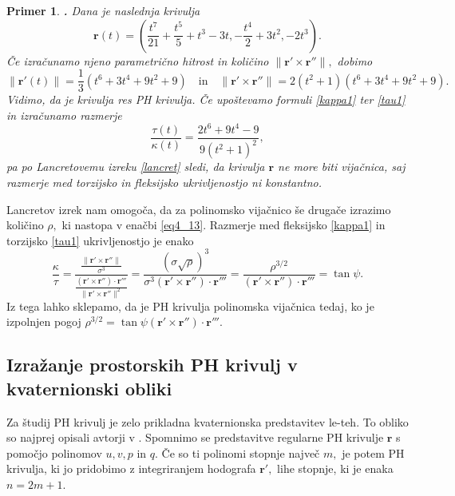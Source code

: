 \documentclass[12pt,a4paper,twoside]{article}
\theoremstyle{definition} %
\theoremstyle{plain} %
\theoremstyle{primerstyle}
\newtheorem{primer}[definicija]{Primer}
\numberwithin{equation}{section}  %
\newcommand{\fleksija}{\frac{\lVert \mathbf{r}'\times\mathbf{r}'' \rVert}{\sigma^3}}
\newcommand{\torzija}{\frac{(\mathbf{r}'\times\mathbf{r}'')\cdot\mathbf{r}'''}{\lVert \mathbf{r}'\times\mathbf{r}'' \rVert^2}}
\newcommand{\rV}{\mathbf{r}}
\begin{document}
\begin{primer}
	\label{PH_ne_vijacnica}
	\textbf{.} Dana je naslednja krivulja
	\begin{equation*}
		\rV(t)=\left ( \frac{t^7}{21}+\frac{t^5}{5}+t^3-3t,-\frac{t^4}{2}+3t^2,-2t^3 \right ).
	\end{equation*}
	Če izračunamo njeno parametrično hitrost in količino $\lVert \rV' \times \rV'' \rVert,$ dobimo
	\begin{equation*}
		\lVert \rV'(t) \rVert=\frac{1}{3}(t^6+3t^4+9t^2+9) \quad \text{in} \quad \lVert \rV' \times \rV'' \rVert=2(t^2+1)(t^6+3t^4+9t^2+9).
	\end{equation*}
	Vidimo, da je krivulja res PH krivulja. Če upoštevamo formuli \eqref{kappa1} ter \eqref{tau1} in izračunamo razmerje
	\begin{equation*}
		\frac{\tau(t)}{\kappa(t)}=\frac{2t^6+9t^4-9}{9(t^2+1)^2},
	\end{equation*}
	pa po Lancretovemu izreku \ref{lancret} sledi, da krivulja $\rV$ ne more biti vijačnica, saj razmerje med torzijsko in fleksijsko ukrivljenostjo ni konstantno.
\end{primer}

Lancretov izrek nam omogoča, da za polinomsko vijačnico še drugače izrazimo količino $\rho,$ ki nastopa v enačbi \eqref{eq4_13}. Razmerje med fleksijsko \eqref{kappa1} in torzijsko \eqref{tau1} ukrivljenostjo je enako
\begin{equation}
	\label{rho3over2}
	\frac{\kappa}{\tau}=\frac{\fleksija}{\torzija}=\frac{(\sigma \sqrt{\rho})^3}{\sigma^3(\rV'\times\rV'')\cdot\rV'''}=\frac{\rho^{3/2}}{(\rV'\times\rV'')\cdot\rV'''}=\tan \psi.
\end{equation}
Iz tega lahko sklepamo, da je PH krivulja polinomska vijačnica tedaj, ko je izpolnjen pogoj $\rho^{3/2}=\tan \psi (\rV'\times\rV'')\cdot\rV'''.$

\subsection{Izražanje prostorskih PH krivulj v kvaternionski obliki}
\label{PH_kvaternioni}

Za študij PH krivulj je zelo prikladna kvaternionska predstavitev le-teh. To obliko so najprej opisali avtorji v \cite{choi2002clifford}. Spomnimo se predstavitve regularne PH krivulje $\rV$ s pomočjo polinomov $u,v,p$ in $q.$ Če so ti polinomi stopnje največ $m,$ je potem PH krivulja, ki jo pridobimo z integriranjem hodografa $\rV',$ lihe stopnje, ki je enaka $n=2m+1.$
\end{document}
